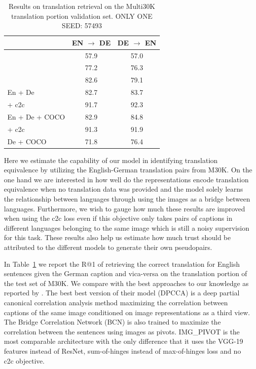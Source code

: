\begin{table}[]
    \centering
    \begin{tabular}{lcc}
    \toprule
    & EN $\rightarrow$ DE & DE $\rightarrow$ EN \\
    \midrule
    \citet{rajendran2015bridge} & 57.9 & 57.0 \\
    \citet{D17-1303} &  77.2 & 76.3 \\
    \citet{rotman2018bridging} &  82.6 & 79.1 \\
    \midrule
    En + De & 82.7   & 83.7  \\
    \; + c2c & 91.7   & 92.3  \\
    En + De + COCO & 82.9    & 84.8    \\
    \; + c2c & 91.3   & 91.9  \\
    De + COCO & 71.8 &  76.4  \\
        \bottomrule
    \end{tabular}
    \caption{Results on translation retrieval on the Multi30K translation portion validation set. ONLY ONE SEED: 57493}
    \label{tab:translate}
\end{table}

Here we estimate the capability of our model in identifying
translation equivalence by utilizing the English-German
translation pairs from M30K. 
On the one hand we are interested in how well
do the representations encode translation equivalence when 
no translation data was provided and the model solely learns the 
relationship between languages through using the images 
as a bridge between languages. 
Furthermore, we wish to gauge how much these results 
are improved when using
the c2c loss even if this objective only takes pairs
of captions in different languages belonging to the same image
which is still a noisy supervision for this task.
These results also help us estimate how much 
trust should be attributed to the different models
to generate their own pseudopairs.

In Table~\ref{tab:translate}
we report the R@1 of retrieving the correct translation for 
English sentences given the German caption and vica-versa on 
the translation portion of the test set of M30K.
We compare with the best approaches to our knowledge as
reported by \cite{rotman2018bridging}. 
The best best version of their
model (DPCCA) is a deep partial canonical correlation 
analysis method maximizing the correlation between
captions of the same image conditioned 
on image representations as a third view. 
The Bridge Correlation Network (BCN) 
\cite{rajendran2015bridge} is also trained to maximize the 
correlation between the sentences using images as pivots.
IMG\_PIVOT \cite{D17-1303} is the most comparable architecture
with the only difference that it uses the VGG-19 
features instead of ResNet, sum-of-hinges instead 
of max-of-hinges loss and no c2c objective. 

